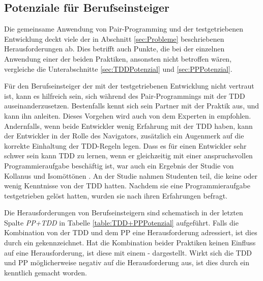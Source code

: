 \subsection{Potenziale für Berufseinsteiger}

Die gemeinsame Anwendung von Pair-Programming und der testgetriebenen Entwicklung deckt viele der in Abschnitt \ref{sec:Probleme} beschriebenen Herausforderungen ab. Dies betrifft auch Punkte, die bei der einzelnen Anwendung einer der beiden Praktiken, ansonsten nicht betroffen wären, vergleiche die Unterabschnitte \ref{sec:TDDPotenzial} und \ref{sec:PPPotenzial}.

Für den Berufseinsteiger der mit der testgetriebenen Entwicklung nicht vertraut ist, kann es hilfreich sein, sich während des Pair-Programmings mit der TDD auseinanderzusetzen. Bestenfalls kennt sich sein Partner mit der Praktik aus, und kann ihn anleiten. Dieses Vorgehen wird auch von dem Experten in \cite{Shull2010WhatDevelopment} empfohlen. Andernfalls, wenn beide Entwickler wenig Erfahrung mit der TDD haben, kann der Entwickler in der Rolle des Navigators, zusätzlich ein Augenmerk auf die korrekte Einhaltung der TDD-Regeln legen. Dass es für einen Entwickler sehr schwer sein kann TDD zu lernen, wenn er gleichzeitig mit einer anspruchsvollen Programmieraufgabe beschäftig ist, war auch ein Ergebnis der Studie von Kollanus und Isomöttönen \cite{Kollanus2008Test-drivenViewpoints}. An der Studie nahmen Studenten teil, die keine oder wenig Kenntnisse von der TDD hatten. Nachdem sie eine Programmieraufgabe testgetrieben gelöst hatten, wurden sie nach ihren Erfahrungen befragt.

Die Herausforderungen von Berufseinsteigern sind schematisch in der letzten Spalte \textit{PP+TDD} in Tabelle \ref{table:TDD+PPPotenzial} aufgeführt. Falls die Kombination von der TDD und dem PP eine Herausforderung adressiert, ist dies durch ein \checkmark gekennzeichnet. Hat die Kombination beider Praktiken keinen Einfluss auf eine Herausforderung, ist diese mit einem - dargestellt. Wirkt sich die TDD und PP möglicherweise negativ auf die Herausforderung aus, ist dies durch ein \danger kenntlich gemacht worden.

